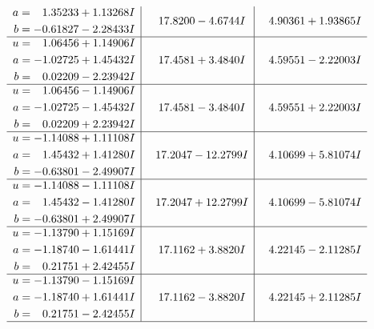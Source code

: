 \documentclass[1p]{elsarticle_modified}
\theoremstyle{definition}
\begin{document}
$$\begin{array}{c|c|c}
\begin{aligned}
a &= \phantom{-}1.35233 + 1.13268 I \\
b &= -0.61827 - 2.28433 I\end{aligned}
 & \phantom{-}17.8200 - 4.6744 I & \phantom{-}4.90361 + 1.93865 I \\ \hline\begin{aligned}
u &= \phantom{-}1.06456 + 1.14906 I \\
a &= -1.02725 + 1.45432 I \\
b &= \phantom{-}0.02209 - 2.23942 I\end{aligned}
 & \phantom{-}17.4581 + 3.4840 I & \phantom{-}4.59551 - 2.22003 I \\ \hline\begin{aligned}
u &= \phantom{-}1.06456 - 1.14906 I \\
a &= -1.02725 - 1.45432 I \\
b &= \phantom{-}0.02209 + 2.23942 I\end{aligned}
 & \phantom{-}17.4581 - 3.4840 I & \phantom{-}4.59551 + 2.22003 I \\ \hline\begin{aligned}
u &= -1.14088 + 1.11108 I \\
a &= \phantom{-}1.45432 + 1.41280 I \\
b &= -0.63801 - 2.49907 I\end{aligned}
 & \phantom{-}17.2047 - 12.2799 I & \phantom{-}4.10699 + 5.81074 I \\ \hline\begin{aligned}
u &= -1.14088 - 1.11108 I \\
a &= \phantom{-}1.45432 - 1.41280 I \\
b &= -0.63801 + 2.49907 I\end{aligned}
 & \phantom{-}17.2047 + 12.2799 I & \phantom{-}4.10699 - 5.81074 I \\ \hline\begin{aligned}
u &= -1.13790 + 1.15169 I \\
a &= -1.18740 - 1.61441 I \\
b &= \phantom{-}0.21751 + 2.42455 I\end{aligned}
 & \phantom{-}17.1162 + 3.8820 I & \phantom{-}4.22145 - 2.11285 I \\ \hline\begin{aligned}
u &= -1.13790 - 1.15169 I \\
a &= -1.18740 + 1.61441 I \\
b &= \phantom{-}0.21751 - 2.42455 I\end{aligned}
 & \phantom{-}17.1162 - 3.8820 I & \phantom{-}4.22145 + 2.11285 I\\
 \hline 
 \end{array}$$\newpage\newpage\renewcommand{\arraystretch}{1}
\end{document}
